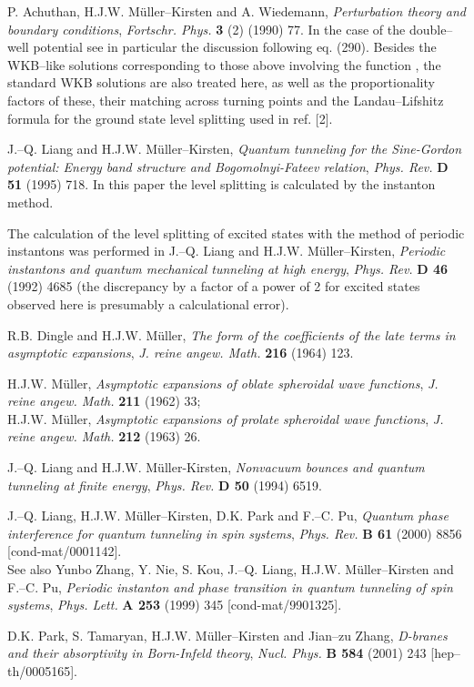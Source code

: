\documentclass[a4paper,12pt,a4]{article}
\begin{document}
\begin{thebibliography}{99}
  P. Achuthan, H.J.W. M\"{u}ller--Kirsten and A. Wiedemann, {\it %
Perturbation theory and boundary conditions}, {\it Fortschr. Phys.} {\bf 3}
(2) (1990) 77. In the case of the double--well potential see in particular
the discussion following eq. (290). Besides the WKB--like solutions
corresponding to those above involving the function \coordHE{}, the standard WKB
solutions are also treated here, as well as the proportionality factors of
these, their matching across turning points and the Landau--Lifshitz formula
for the ground state level splitting used in ref. [2].

  J.--Q. Liang and H.J.W. M\"{u}ller--Kirsten, {\it Quantum
tunneling for the Sine-Gordon potential: Energy band structure and
Bogomolnyi-Fateev relation}, {\it Phys. Rev.} {\bf D 51} (1995) 718. In this
paper the level splitting is calculated by the instanton method.

  The calculation of the level splitting of excited states with
the method of periodic instantons was performed in J.--Q. Liang and H.J.W.
M\"{u}ller--Kirsten, {\it Periodic instantons and quantum mechanical
tunneling at high energy}, {\it Phys. Rev.} {\bf D 46} (1992) 4685 (the
discrepancy by a factor of a power of 2 for excited states observed here is
presumably a calculational error).

  R.B. Dingle and H.J.W. M\"{u}ller, {\it The form of the
coefficients of the late terms in asymptotic expansions}, {\it J. reine
angew. Math.} {\bf 216} (1964) 123.

  H.J.W. M\"{u}ller, {\it Asymptotic expansions of oblate
spheroidal wave functions}, {\it J. reine angew. Math.} {\bf 211} (1962) 33;\\
H.J.W. M\"{u}ller, {\it Asymptotic expansions of prolate spheroidal wave
functions}, {\it J. reine angew. Math.} {\bf 212} (1963) 26.

  J.--Q. Liang and H.J.W. M\"{u}ller-Kirsten, {\it Nonvacuum
bounces and quantum tunneling at finite energy}, {\it Phys. Rev.} {\bf D 50}
(1994) 6519.

  J.--Q. Liang, H.J.W. M\"{u}ller--Kirsten, D.K. Park and F.--C.
Pu, {\it Quantum phase interference for quantum tunneling in spin systems}, 
{\it Phys. Rev.} {\bf B 61} (2000) 8856 [cond-mat/0001142].\\ See also Yunbo Zhang, Y. Nie, S.
Kou, J.--Q. Liang, H.J.W. M\"{u}ller--Kirsten and F.--C. Pu, {\it Periodic
instanton and phase transition in quantum tunneling of spin systems}, {\it %
Phys. Lett.} {\bf A 253} (1999) 345 [cond-mat/9901325].

  D.K. Park, S. Tamaryan, H.J.W. M\"{u}ller--Kirsten and Jian--zu
Zhang, {\it D-branes and their absorptivity in Born-Infeld theory}, {\it %
Nucl. Phys.} {\bf B 584} (2001) 243 [hep--th/0005165].\bigskip 




\end{thebibliography}
\end{document}
